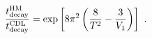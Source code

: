 \begin{equation}\label{decaytimeHM2}
{t^{\rm HM}_{\rm decay}\over t^{\rm CDL}_{\rm decay}}= \exp\left[8\pi^2\left({8\over T^2}-{3\over V_1}\right)\right]\ .
\end{equation}

